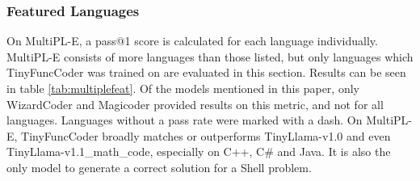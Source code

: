 \subsubsection{Featured Languages}
\label{sec:multiplefeatured}
On MultiPL-E, a pass@1 score is calculated for each language individually.
MultiPL-E consists of more languages than those listed, but only languages which TinyFuncCoder was trained on are evaluated in this section.
Results can be seen in table \ref{tab:multiplefeat}.
Of the models mentioned in this paper, only WizardCoder and Magicoder provided results on this metric, and not for all languages.
Languages without a pass rate were marked with a dash.
On MultiPL-E, TinyFuncCoder broadly matches or outperforms TinyLlama-v1.0 and even TinyLlama-v1.1\_math\_code, especially on C++, C\# and Java.
It is also the only model to generate a correct solution for a Shell problem.

